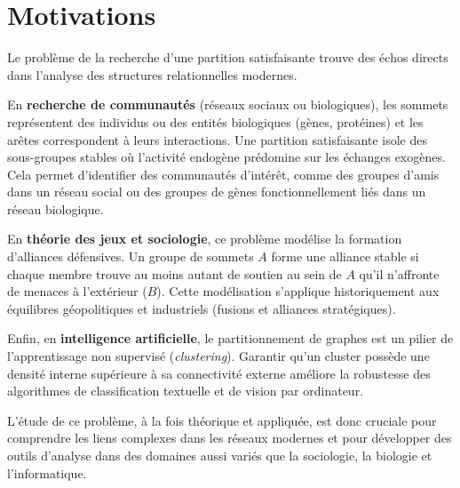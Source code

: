 \section{Motivations}\label{sec:motivations}
Le problème de la recherche d'une partition satisfaisante trouve des échos directs dans l'analyse des structures relationnelles modernes. 

En \textbf{recherche de communautés} (réseaux sociaux ou biologiques), les sommets représentent des individus ou des entités biologiques (gènes, protéines) et les arêtes correspondent à leurs interactions. 
Une partition satisfaisante isole des sous-groupes stables où l'activité endogène prédomine sur les échanges exogènes.
Cela permet d'identifier des communautés d'intérêt, comme des groupes d'amis dans un réseau social ou des groupes de gènes fonctionnellement liés dans un réseau biologique.

En \textbf{théorie des jeux et sociologie}, ce problème modélise la formation d'alliances défensives. 
Un groupe de sommets \(A\) forme une alliance stable si chaque membre trouve au moins autant de soutien au sein de \(A\) qu'il n'affronte de menaces à l'extérieur (\(B\)). 
Cette modélisation s'applique historiquement aux équilibres géopolitiques et industriels (fusions et alliances stratégiques).

Enfin, en \textbf{intelligence artificielle}, le partitionnement de graphes est un pilier de l'apprentissage non supervisé (\textit{clustering}). 
Garantir qu'un cluster possède une densité interne supérieure à sa connectivité externe améliore la robustesse des algorithmes de classification textuelle et de vision par ordinateur.

L'étude de ce problème, à la fois théorique et appliquée, est donc cruciale pour comprendre les liens complexes dans les réseaux modernes et pour développer des outils d'analyse dans des domaines aussi variés que la sociologie, la biologie et l'informatique.